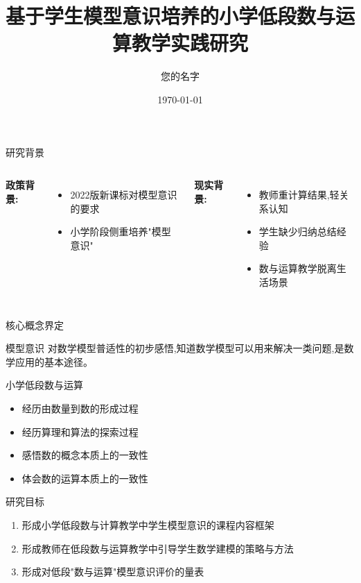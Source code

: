\documentclass{beamer}
\title{基于学生模型意识培养的小学低段数与运算教学实践研究}
\author{您的名字}
\institute{您的机构}
\date{\today}
\begin{document}
\begin{frame}
	\titlepage
\end{frame}

\begin{frame}{研究背景}
	\begin{columns}[t]
		\textbf{政策背景:}
		\begin{itemize}
			\item 2022版新课标对模型意识的要求
			\item 小学阶段侧重培养"模型意识"
		\end{itemize}

		\textbf{现实背景:}
		\begin{itemize}
			\item 教师重计算结果,轻关系认知
			\item 学生缺少归纳总结经验
			\item 数与运算教学脱离生活场景
		\end{itemize}
	\end{columns}
\end{frame}

\begin{frame}{核心概念界定}
	\begin{block}{模型意识}
		对数学模型普适性的初步感悟,知道数学模型可以用来解决一类问题,是数学应用的基本途径。
	\end{block}
	\begin{block}{小学低段数与运算}
		\begin{itemize}
			\item 经历由数量到数的形成过程
			\item 经历算理和算法的探索过程
			\item 感悟数的概念本质上的一致性
			\item 体会数的运算本质上的一致性
		\end{itemize}
	\end{block}
\end{frame}

\begin{frame}{研究目标}
	\begin{enumerate}
		\item 形成小学低段数与计算教学中学生模型意识的课程内容框架
		\item 形成教师在低段数与运算教学中引导学生数学建模的策略与方法
		\item 形成对低段"数与运算"模型意识评价的量表
	\end{enumerate}
\end{frame}
\end{document}
